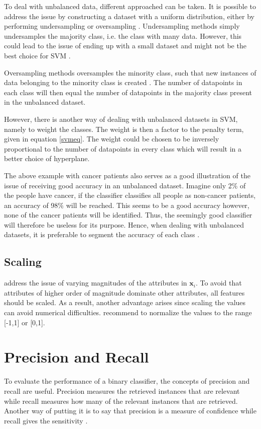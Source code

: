 To deal with unbalanced data, different approached can be taken. It is possible to address the issue by constructing a dataset with a uniform distribution, either by performing undersampling or oversampling \citep{delRio2014}. Undersampling methods simply undersamples the majority class, i.e. the class with many data. However, this could lead to the issue of ending up with a small dataset and might not be the best choice for SVM \citep{Akbani2004}. 

Oversampling methods oversamples the minority class, such that new instances of data belonging to the minority class is created \citep{delRio2014,Akbani2004}. The number of datapoints in each class will then equal the number of datapoints in the majority class present in the unbalanced dataset.

However, there is another way of dealing with unbalanced datasets in SVM, namely to weight the classes. The weight is then a factor to the penalty term, given in equation \eqref{svmeq}. The weight could be chosen to be inversely proportional to the number of datapoints in every class which will result in a better choice of hyperplane. 

The above example with cancer patients also serves as a good illustration of the issue of receiving good accuracy in an unbalanced dataset. Imagine only 2\% of the people have cancer, if the classifier classifies all people as non-cancer patients, an accuracy of 98\% will be reached. This seems to be a good accuracy however, none of the cancer patients will be identified. Thus, the seemingly good classifier will therefore be useless for its purpose. Hence, when dealing with unbalanced datasets, it is preferable to segment the accuracy of each class \citep{delRio2014}. 

\subsection{Scaling \label{scale}}
\citet{Hsu10apractical} address the issue of varying magnitudes of the attributes in $\bm{x}_i$. To avoid that attributes of higher order of magnitude dominate other attributes, all features should be scaled. As a result, another advantage arises since scaling the values can avoid numerical difficulties. \citet{Hsu10apractical} recommend to normalize the values to the range [-1,1] or [0,1].

\section{Precision and Recall}
To evaluate the performance of a binary classifier, the concepts of precision and recall are useful. Precision measures the retrieved instances that are relevant while recall measures how many of the relevant instances that are retrieved. Another way of putting it is to say that precision is a measure of confidence while recall gives the sensitivity \citep{powers2011}.

